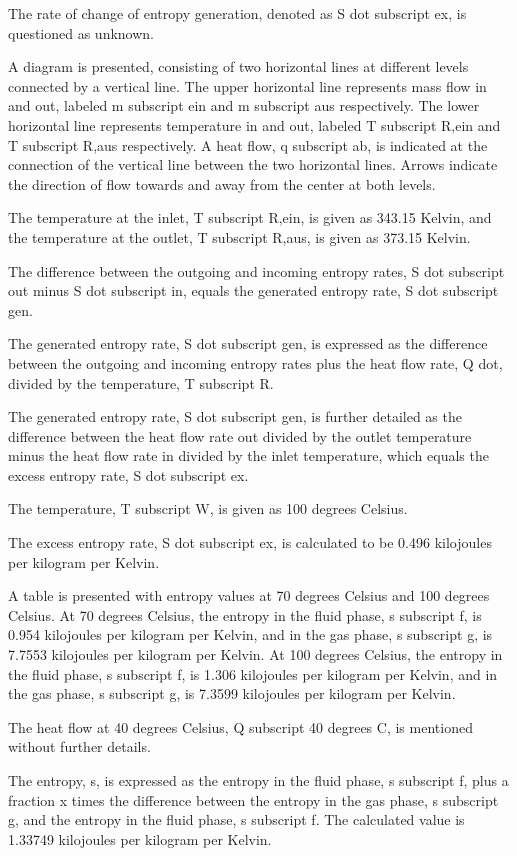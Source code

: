 The rate of change of entropy generation, denoted as S dot subscript ex, is questioned as unknown.

A diagram is presented, consisting of two horizontal lines at different levels connected by a vertical line. The upper horizontal line represents mass flow in and out, labeled m subscript ein and m subscript aus respectively. The lower horizontal line represents temperature in and out, labeled T subscript R,ein and T subscript R,aus respectively. A heat flow, q subscript ab, is indicated at the connection of the vertical line between the two horizontal lines. Arrows indicate the direction of flow towards and away from the center at both levels.

The temperature at the inlet, T subscript R,ein, is given as 343.15 Kelvin, and the temperature at the outlet, T subscript R,aus, is given as 373.15 Kelvin.

The difference between the outgoing and incoming entropy rates, S dot subscript out minus S dot subscript in, equals the generated entropy rate, S dot subscript gen.

The generated entropy rate, S dot subscript gen, is expressed as the difference between the outgoing and incoming entropy rates plus the heat flow rate, Q dot, divided by the temperature, T subscript R.

The generated entropy rate, S dot subscript gen, is further detailed as the difference between the heat flow rate out divided by the outlet temperature minus the heat flow rate in divided by the inlet temperature, which equals the excess entropy rate, S dot subscript ex.

The temperature, T subscript W, is given as 100 degrees Celsius.

The excess entropy rate, S dot subscript ex, is calculated to be 0.496 kilojoules per kilogram per Kelvin.

A table is presented with entropy values at 70 degrees Celsius and 100 degrees Celsius. At 70 degrees Celsius, the entropy in the fluid phase, s subscript f, is 0.954 kilojoules per kilogram per Kelvin, and in the gas phase, s subscript g, is 7.7553 kilojoules per kilogram per Kelvin. At 100 degrees Celsius, the entropy in the fluid phase, s subscript f, is 1.306 kilojoules per kilogram per Kelvin, and in the gas phase, s subscript g, is 7.3599 kilojoules per kilogram per Kelvin.

The heat flow at 40 degrees Celsius, Q subscript 40 degrees C, is mentioned without further details.

The entropy, s, is expressed as the entropy in the fluid phase, s subscript f, plus a fraction x times the difference between the entropy in the gas phase, s subscript g, and the entropy in the fluid phase, s subscript f. The calculated value is 1.33749 kilojoules per kilogram per Kelvin.